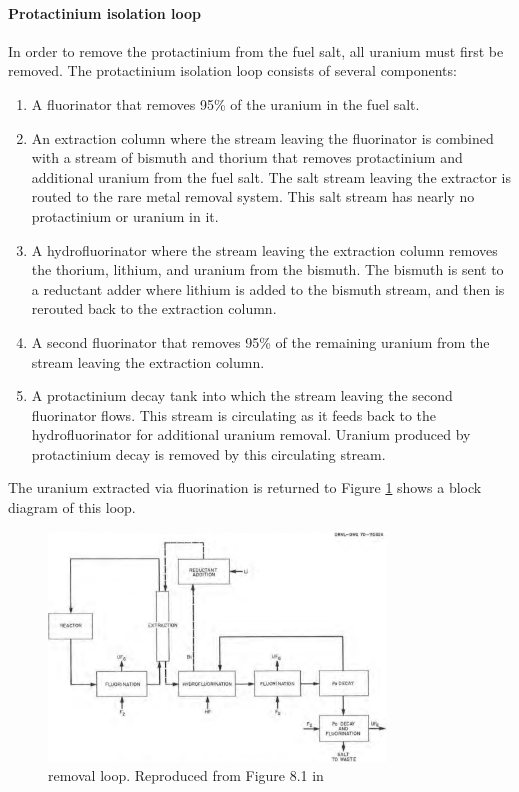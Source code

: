 \paragraph{Protactinium isolation loop}
In order to remove the protactinium from the fuel salt, all uranium must first be removed. The protactinium isolation loop consists of several components: 
\begin{enumerate}
    \item A fluorinator that removes 95\% of the uranium in the fuel salt.
    \item An extraction column where the stream leaving the fluorinator is combined with a stream of bismuth and thorium that removes protactinium and additional uranium from the fuel salt. The salt stream leaving the extractor is routed to the rare metal removal system. This salt stream has nearly no protactinium or uranium in it.
    \item A hydrofluorinator where the stream leaving the extraction column removes the thorium, lithium, and uranium from the bismuth. The bismuth is sent to a reductant adder where lithium is added to the bismuth stream, and then is rerouted back to the extraction column.
    \item A second fluorinator that removes 95\% of the remaining uranium from the stream leaving the extraction column.
    \item A protactinium decay tank into which the stream leaving the second fluorinator flows. This stream is circulating as it feeds back to the hydrofluorinator for additional uranium removal. Uranium produced by protactinium decay is removed by this circulating stream.
\end{enumerate}

The uranium extracted via fluorination is returned to 
Figure \ref{fig:pa-removal} shows a block diagram of this loop. 

\begin{figure}[htpb]
    \centering
    \includegraphics[width=0.8\textwidth]{figs/ch4/pa_removal_loop.png}
    \caption{ removal loop. Reproduced from Figure 8.1 in \cite{robertson_conceptual_1971}}
    \label{fig:pa-removal}
\end{figure}

